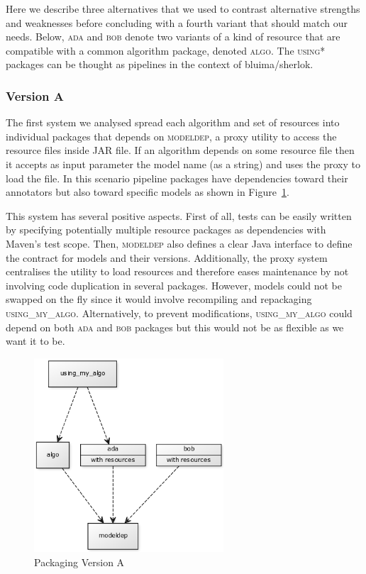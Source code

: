 \documentclass{article}
\newcommand{\ID}[1]{{\textsc{#1}}}
\newcommand{\JAR}{JAR\xspace}
\begin{document}
Here we describe three alternatives that we used to contrast alternative strengths and weaknesses before concluding with a fourth variant that should match our needs. Below, \ID{ada} and \ID{bob} denote two variants of a kind of resource that are compatible with a common algorithm package, denoted \ID{algo}. The \ID{using*} packages can be thought as pipelines in the context of bluima/sherlok.

\subsubsection{Version A}

The first system we analysed spread each algorithm and set of resources into individual packages
that depends on \ID{modeldep}, a proxy utility to access the resource files inside \JAR file. If an
algorithm depends on some resource file then it accepts as input parameter the model name (as a
string) and uses the proxy to load the file. In this scenario pipeline packages have dependencies
toward their annotators but also toward specific models as shown in Figure~\ref{fig:pkgsysA}.

This system has several positive aspects. First of all, tests can be easily written by specifying potentially multiple resource packages as dependencies with Maven's test scope. Then, \ID{modeldep} also defines a clear Java interface to define the contract for models and their versions. Additionally, the proxy system centralises the utility to load resources and therefore eases maintenance by not involving code duplication in several packages. However, models could not be swapped on the fly since it would involve recompiling and repackaging \ID{using\_my\_algo}.  Alternatively, to prevent modifications, \ID{using\_my\_algo} could depend on both \ID{ada} and \ID{bob} packages but this would not be as flexible as we want it to be.

\begin{figure}
\centering
\includegraphics[width=200pt]{res/packaging_version_A.png}
\caption{Packaging Version A}
\label{fig:pkgsysA}
\end{figure}
\end{document}
